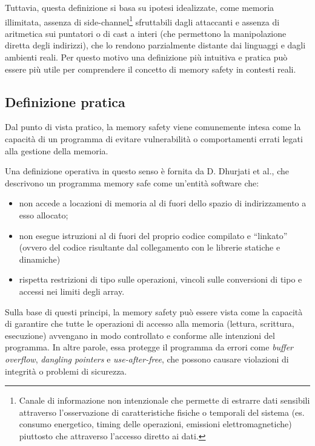 Tuttavia, questa definizione si basa su ipotesi idealizzate, come memoria
illimitata, assenza di side-channel\footnote{Canale di informazione non
intenzionale che permette di estrarre dati sensibili attraverso l'osservazione
di caratteristiche fisiche o temporali del sistema (es. consumo energetico, timing
delle operazioni, emissioni elettromagnetiche) piuttosto che attraverso l'accesso
diretto ai dati.} sfruttabili dagli attaccanti e assenza di aritmetica sui
puntatori o di cast a interi (che permettono la manipolazione diretta degli indirizzi),
che lo rendono parzialmente distante dai linguaggi e dagli ambienti reali. Per
questo motivo una definizione più intuitiva e pratica può essere più utile per
comprendere il concetto di memory safety in contesti reali.

\subsection{Definizione pratica}
\label{sec:practical_definition}

Dal punto di vista pratico, la memory safety viene comunemente intesa come la
capacità di un programma di evitare vulnerabilità o comportamenti errati legati
alla gestione della memoria.

Una definizione operativa in questo senso è fornita da D. Dhurjati et al.\cite{memory_safety_without_runtime_checks},
che descrivono un programma memory safe come un'entità software che:
\begin{itemize}
  \item non accede a locazioni di memoria al di fuori dello spazio di indirizzamento
    a esso allocato;

  \item non esegue istruzioni al di fuori del proprio codice compilato e ``linkato''
    (ovvero del codice risultante dal collegamento con le librerie statiche e
    dinamiche)

  \item rispetta restrizioni di tipo sulle operazioni, vincoli sulle conversioni
    di tipo e accessi nei limiti degli array.
\end{itemize}

Sulla base di questi principi, la memory safety può essere vista come la capacità
di garantire che tutte le operazioni di accesso alla memoria (lettura, scrittura,
esecuzione) avvengano in modo controllato e conforme alle intenzioni del programma.
In altre parole, essa protegge il programma da errori come \textit{buffer
overflow}, \textit{dangling pointers} e \textit{use-after-free}, che possono
causare violazioni di integrità o problemi di sicurezza.

